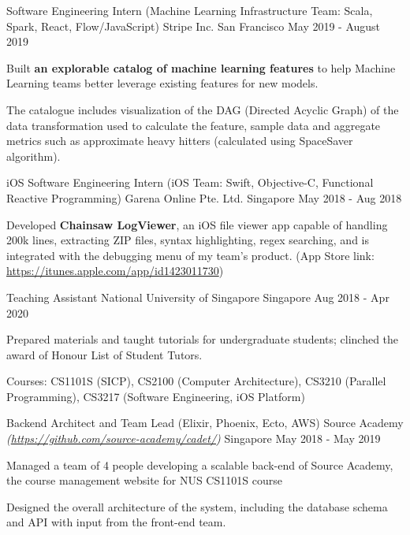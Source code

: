 \begin{cventries}
  \cventry
  {Software Engineering Intern (Machine Learning Infrastructure Team: Scala, Spark, React, Flow/JavaScript)} %
  {Stripe Inc.} %
  {San Francisco} %
  {May 2019 - August 2019} %
  {
    \begin{cvitems}
      \item {Built \textbf{an explorable catalog of machine learning features} to help Machine Learning teams better leverage existing features for new models.}
      \item {The catalogue includes visualization of the DAG (Directed Acyclic Graph) of the data transformation used to calculate the feature, sample data and aggregate metrics such as approximate heavy hitters (calculated using SpaceSaver algorithm).}
    \end{cvitems}
  }

  \cventry
  {iOS Software Engineering Intern (iOS Team: Swift, Objective-C, Functional Reactive Programming)} %
  {Garena Online Pte. Ltd.} %
  {Singapore} %
  {May 2018 - Aug 2018} %
  {
    \begin{cvitems}
      \item {Developed \textbf{Chainsaw LogViewer}, an iOS file viewer app capable of handling 200k lines, extracting ZIP files, syntax highlighting, regex searching, and is integrated with the debugging menu of my team's product. (App Store link: \url{https://itunes.apple.com/app/id1423011730})}
    \end{cvitems}
  }

  \cventry
  {Teaching Assistant} %
  {National University of Singapore} %
  {Singapore} %
  {Aug 2018 - Apr 2020} %
  {
    \begin{cvitems}
      \item {Prepared materials and taught tutorials for undergraduate students; clinched the award of Honour List of Student Tutors.}
      \item {Courses: CS1101S (SICP), CS2100 (Computer Architecture), CS3210 (Parallel Programming), CS3217 (Software Engineering, iOS Platform)}
    \end{cvitems}
  }

  \cventry
  {Backend Architect and Team Lead (Elixir, Phoenix, Ecto, AWS)} %
  {Source Academy \textmd{\em\tiny(\url{https://github.com/source-academy/cadet/})}} %
  {Singapore} %
  {May 2018 - May 2019} %
  {
    \begin{cvitems}
      \item {Managed a team of 4 people developing a scalable back-end of Source Academy, the course management website for NUS CS1101S course}
      \item {Designed the overall architecture of the system, including the database schema and API with input from the front-end team.}
    \end{cvitems}
  }

\end{cventries}
